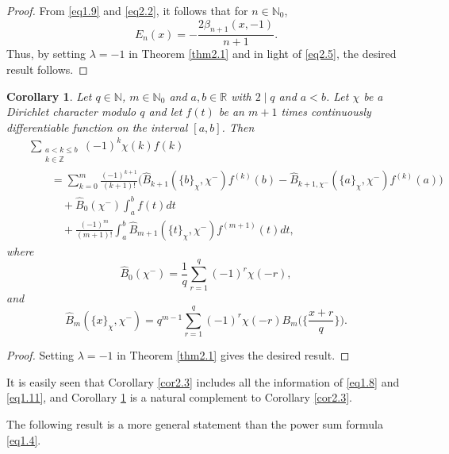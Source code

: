 \documentclass[reqno]{amsart}
\numberwithin{equation}{section}
\newtheorem{corollary}[thm]{Corollary}
\begin{document}
\begin{proof}
From \eqref{eq1.9} and \eqref{eq2.2}, it follows that for $n\in\mathbb{N}_{0}$,
\begin{equation}\label{eq2.5}
E_{n}(x)=-\frac{2\beta_{n+1}(x,-1)}{n+1}.
\end{equation}
Thus, by setting $\lambda=-1$ in Theorem \ref{thm2.1} and in light of \eqref{eq2.5}, the desired result follows.
\end{proof}

\begin{corollary}\label{cor2.4} Let $q\in\mathbb{N}$, $m\in\mathbb{N}_{0}$ and $a,b\in\mathbb{R}$ with $2\mid q$ and $a<b$. Let $\chi$ be a Dirichlet character modulo $q$ and let $f(t)$ be an $m+1$
times continuously differentiable function on the interval $[a,b]$. Then
\begin{eqnarray}\label{eq2.6}
&&\sum_{\substack{a<k\leqslant b\\k\in\mathbb{Z}}}(-1)^{k}\chi(k)f(k)\nonumber\\
&&\qquad=\sum_{k=0}^{m}\frac{(-1)^{k+1}}{(k+1)!}\bigl(\widehat{B}_{k+1}(\{b\}_{\chi},\chi^{-})f^{(k)}(b)-\widehat{B}_{k+1,\chi^{-}}(\{a\}_{\chi},\chi^{-})f^{(k)}(a)\bigl)\nonumber\\
&&\qquad\quad+\widehat{B}_{0}(\chi^{-})\int_{a}^{b}f(t)dt\nonumber\\
&&\qquad\quad+\frac{(-1)^{m}}{(m+1)!}\int_{a}^{b}\widehat{B}_{m+1}(\{t\}_{\chi},\chi^{-})f^{(m+1)}(t)dt,
\end{eqnarray}
where
\begin{equation*}
\widehat{B}_{0}(\chi^{-})=\frac{1}{q}\sum_{r=1}^{q}(-1)^{r}\chi(-r),
\end{equation*}
and
\begin{equation*}
\widehat{B}_{m}(\{x\}_{\chi},\chi^{-})=q^{m-1}\sum_{r=1}^{q}(-1)^{r}\chi(-r)B_{m}\biggl(\biggl\{\frac{x+r}{q}\biggl\}\biggl).
\end{equation*}
\end{corollary}

\begin{proof}
Setting $\lambda=-1$ in Theorem \ref{thm2.1} gives the desired result.
\end{proof}

It is easily seen that Corollary \ref{cor2.3} includes all the information of \eqref{eq1.8} and \eqref{eq1.11}, and Corollary \ref{cor2.4} is a natural complement to Corollary \ref{cor2.3}.

The following result is a more general statement than the power
sum formula \eqref{eq1.4}.
\end{document}
